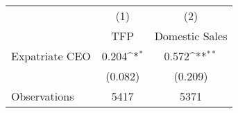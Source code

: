 {
\def\sym#1{\ifmmode^{#1}\else\(^{#1}\)\fi}
\begin{tabular}{l*{2}{c}}
\hline\hline
                    &\multicolumn{1}{c}{(1)}&\multicolumn{1}{c}{(2)}\\
                    &\multicolumn{1}{c}{TFP}&\multicolumn{1}{c}{Domestic Sales}\\
\hline
Expatriate CEO      &       0.204\sym{*}  &       0.572\sym{**} \\
                    &     (0.082)         &     (0.209)         \\
\hline
Observations        &        5417         &        5371         \\
\hline\hline
\end{tabular}
}

